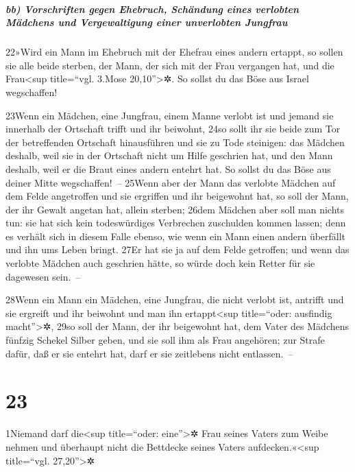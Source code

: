 \hypertarget{bb-vorschriften-gegen-ehebruch-schuxe4ndung-eines-verlobten-muxe4dchens-und-vergewaltigung-einer-unverlobten-jungfrau}{%
\subparagraph{bb) Vorschriften gegen Ehebruch, Schändung eines verlobten
Mädchens und Vergewaltigung einer unverlobten
Jungfrau}\label{bb-vorschriften-gegen-ehebruch-schuxe4ndung-eines-verlobten-muxe4dchens-und-vergewaltigung-einer-unverlobten-jungfrau}}

22»Wird ein Mann im Ehebruch mit der Ehefrau eines andern ertappt, so
sollen sie alle beide sterben, der Mann, der sich mit der Frau vergangen
hat, und die Frau\textless sup title=``vgl. 3.Mose 20,10''\textgreater✲.
So sollst du das Böse aus Israel wegschaffen!

23Wenn ein Mädchen, eine Jungfrau, einem Manne verlobt ist und jemand
sie innerhalb der Ortschaft trifft und ihr beiwohnt, 24so sollt ihr sie
beide zum Tor der betreffenden Ortschaft hinausführen und sie zu Tode
steinigen: das Mädchen deshalb, weil sie in der Ortschaft nicht um Hilfe
geschrien hat, und den Mann deshalb, weil er die Braut eines andern
entehrt hat. So sollst du das Böse aus deiner Mitte wegschaffen!~--
25Wenn aber der Mann das verlobte Mädchen auf dem Felde angetroffen und
sie ergriffen und ihr beigewohnt hat, so soll der Mann, der ihr Gewalt
angetan hat, allein sterben; 26dem Mädchen aber soll man nichts tun: sie
hat sich kein todeswürdiges Verbrechen zuschulden kommen lassen; denn es
verhält sich in diesem Falle ebenso, wie wenn ein Mann einen andern
überfällt und ihn ums Leben bringt. 27Er hat sie ja auf dem Felde
getroffen; und wenn das verlobte Mädchen auch geschrien hätte, so würde
doch kein Retter für sie dagewesen sein.~--

28Wenn ein Mann ein Mädchen, eine Jungfrau, die nicht verlobt ist,
antrifft und sie ergreift und ihr beiwohnt und man ihn
ertappt\textless sup title=``oder: ausfindig macht''\textgreater✲, 29so
soll der Mann, der ihr beigewohnt hat, dem Vater des Mädchens fünfzig
Schekel Silber geben, und sie soll ihm als Frau angehören; zur Strafe
dafür, daß er sie entehrt hat, darf er sie zeitlebens nicht
entlassen.~--

\hypertarget{section-22}{%
\section{23}\label{section-22}}

1Niemand darf die\textless sup title=``oder: eine''\textgreater✲ Frau
seines Vaters zum Weibe nehmen und überhaupt nicht die Bettdecke seines
Vaters aufdecken.«\textless sup title=``vgl. 27,20''\textgreater✲

